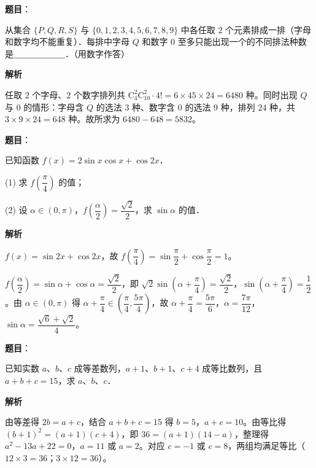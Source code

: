 \begin{answer}

\textbf{题目}：

从集合 $\{P, Q, R, S\}$ 与 $\{0, 1, 2, 3, 4, 5, 6, 7, 8, 9\}$ 中各任取 $2$ 个元素排成一排（字母和数字均不能重复）．每排中字母 $Q$ 和数字 $0$ 至多只能出现一个的不同排法种数是＿＿＿＿＿＿．（用数字作答）

\textbf{解析}

任取 $2$ 个字母、$2$ 个数字排列共 $\mathrm{C}_4^2\mathrm{C}_{10}^2\cdot 4! = 6 \times 45 \times 24 = 6480$ 种。同时出现 $Q$ 与 $0$ 的情形：字母含 $Q$ 的选法 $3$ 种、数字含 $0$ 的选法 $9$ 种，排列 $24$ 种，共 $3 \times 9 \times 24 = 648$ 种。故所求为 $6480 - 648 = 5832$。


\end{answer}
\begin{answer}

\textbf{题目}：

已知函数 $f(x) = 2\sin x\cos x + \cos 2x$．

(1) 求 $f\left(\dfrac{\pi}{4}\right)$ 的值；

(2) 设 $\alpha \in (0, \pi)$，$f\left(\dfrac{\alpha}{2}\right) = \dfrac{\sqrt{2}}{2}$，求 $\sin\alpha$ 的值．

\textbf{解析}


$f(x) = \sin 2x + \cos 2x$，故 $f\left(\dfrac{\pi}{4}\right) = \sin\dfrac{\pi}{2} + \cos\dfrac{\pi}{2} = 1$。


$f\left(\dfrac{\alpha}{2}\right) = \sin\alpha + \cos\alpha = \dfrac{\sqrt{2}}{2}$，即 $\sqrt{2}\sin\left(\alpha + \dfrac{\pi}{4}\right) = \dfrac{\sqrt{2}}{2}$，$\sin\left(\alpha + \dfrac{\pi}{4}\right) = \dfrac{1}{2}$。由 $\alpha \in (0, \pi)$ 得 $\alpha + \dfrac{\pi}{4} \in \left(\dfrac{\pi}{4}, \dfrac{5\pi}{4}\right)$，故 $\alpha + \dfrac{\pi}{4} = \dfrac{5\pi}{6}$，$\alpha = \dfrac{7\pi}{12}$，$\sin\alpha = \dfrac{\sqrt{6} + \sqrt{2}}{4}$。



\end{answer}
\begin{answer}

\textbf{题目}：

已知实数 $a$、$b$、$c$ 成等差数列，$a + 1$、$b + 1$、$c + 4$ 成等比数列，且 $a + b + c = 15$，求 $a$、$b$、$c$．

\textbf{解析}

由等差得 $2b = a + c$，结合 $a + b + c = 15$ 得 $b = 5$，$a + c = 10$。由等比得 $(b + 1)^2 = (a + 1)(c + 4)$，即 $36 = (a + 1)(14 - a)$，整理得 $a^2 - 13a + 22 = 0$，$a = 11$ 或 $a = 2$。对应 $c = -1$ 或 $c = 8$，两组均满足等比（$12 \times 3 = 36$；$3 \times 12 = 36$）。


\end{answer}
